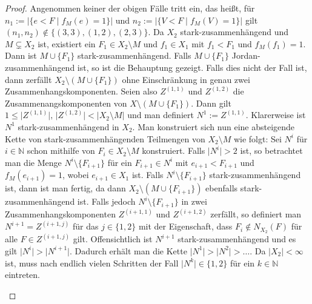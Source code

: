 \documentclass[12pt,titlepage,twoside,cleardoublepage]{article}
\theoremstyle{nummermitklammern}
\numberwithin{equation}{section}
\begin{document}
\begin{proof}
Angenommen keiner der obigen Fälle tritt ein, das heißt, für $n_1:= \vert\{e <F \mid f_M(e)=1\}\vert$ und $n_2:=\vert \{V<F \mid f_M(V)=1\}\vert$ gilt $(n_1,n_2)\notin \{(3,3),(1,2),(2,3)\}$. Da $X_2$ stark-zusammenhängend und $M \subsetneq X_2$ ist, existiert ein $F_1\in X_2\setminus M$ und $f_1 \in X_1$ mit $f_1<F_1$ und $f_M(f_1)=1$. Dann ist $M \cup \{F_1\}$ stark-zusammenhängend. Falls $M \cup \{F_1\}$ Jordan-zusammenhängend ist, so ist die Behauptung gezeigt. Falls dies nicht der Fall ist, dann zerfällt $X_2 \setminus (M \cup \{F_1\})$  ohne Einschränkung in genau zwei  Zusammenhangskomponenten. Seien also $Z^{(1,1)}$ und $Z^{(1,2)}$ die Zusammenangskomponenten von $X\setminus (M \cup \{F_1\})$. Dann gilt $1\leq \vert Z^{(1,1)}\vert,\,\vert Z^{(1,2)}\vert < \vert X_2\setminus M\vert$ und man definiert $N^1:=Z^{(1,1)}$. Klarerweise ist $N^1$ stark-zusammenhängend in $X_2$. Man konstruiert sich nun eine absteigende Kette von stark-zusammenhängenden Teilmengen von $X_2\setminus M$  wie folgt:
Sei $N^i$ für $i \in \mathbb{N}$ schon mithilfe von $F_i\in X_2\setminus M$ konstruiert. Falls  $\vert N^i \vert>2$ ist, so betrachtet man die Menge $N^i\setminus \{F_{i+1}\}$ für ein $F_{i+1}\in N^i$ mit $e_{i+1}<F_{i+1}$ und $f_M(e_{i+1})=1$, wobei $e_{i+1} \in X_1$ ist. 
Falls $N^i \setminus \{F_{i+1}\}$ stark-zusammenhängend ist, dann ist man fertig, da dann $X_2\setminus (M \cup \{F_{i+1}\})$ ebenfalls stark-zusammenhängend ist.
 Falls jedoch $N^i \setminus \{F_{i+1}\}$ in zwei Zusammenhangskomponenten $Z^{(i+1,1)}$ und $Z^{(i+1,2)}$ zerfällt, so definiert man $N^{i+1}=Z^{(i+1,j)}$  für das $j \in \{1,2\}$ mit der Eigenschaft, dass $F_{i} \notin N_{X_2}(F)$ für  alle $F \in Z^{(i+1,j)}$ gilt. Offensichtlich ist $N^{i+1}$ stark-zusammenhängend und es gilt $\vert N^{i}\vert >\vert N^{i+1} \vert$. Dadurch erhält man die Kette $\vert N^1 \vert>\vert  N^2 \vert> \ldots$. Da $\vert X_2\vert < \infty$ ist, muss nach endlich vielen Schritten der Fall $\vert N^k \vert \in \{1,2\}$ für ein $k \in \mathbb{N}$ eintreten.


\begin{figure}[H]\label{37}



\end{figure}
\end{proof}
\end{document}
